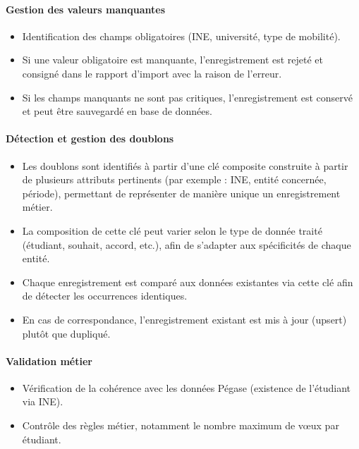\paragraph{Gestion des valeurs manquantes}
\begin{itemize}
    \item Identification des champs obligatoires (INE, université, type de mobilité).
    
    \item Si une valeur obligatoire est manquante, l’enregistrement est rejeté et consigné dans le rapport d’import avec la raison de l’erreur.
    
    \item Si les champs manquants ne sont pas critiques, l’enregistrement est conservé et peut être sauvegardé en base de données.
\end{itemize}

\paragraph{Détection et gestion des doublons}
\begin{itemize}
    \item Les doublons sont identifiés à partir d’une clé composite construite à partir de plusieurs attributs pertinents (par exemple : INE, entité concernée, période), permettant de représenter de manière unique un enregistrement métier.

    \item La composition de cette clé peut varier selon le type de donnée traité (étudiant, souhait, accord, etc.), afin de s’adapter aux spécificités de chaque entité.

    \item Chaque enregistrement est comparé aux données existantes via cette clé afin de détecter les occurrences identiques.

    \item En cas de correspondance, l'enregistrement existant est mis à jour (upsert) plutôt que dupliqué.
\end{itemize}

\paragraph{Validation métier}
\begin{itemize}
    \item Vérification de la cohérence avec les données Pégase (existence de l’étudiant via INE).
    
    \item Contrôle des règles métier, notamment le nombre maximum de vœux par étudiant.
\end{itemize}

